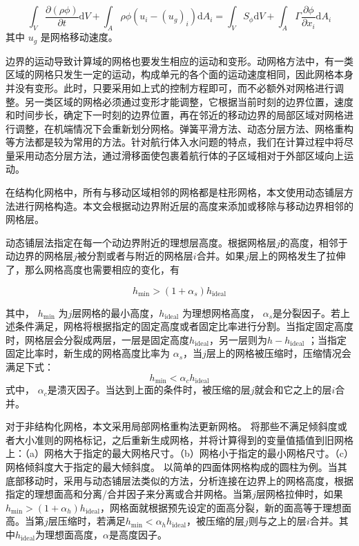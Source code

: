 \begin{equation}
  \int _V \frac {\partial (\rho \phi)} {\partial t} \mathrm dV + \int_A \rho \phi (u_i - (u_g)_i) \mathrm d A_i = \int_V S_\phi \mathrm dV + \int _A \Gamma \frac {\partial \phi}{\partial x_i} \mathrm d A_i
\end{equation}
其中 $u_g$ 是网格移动速度。

边界的运动导致计算域的网格也要发生相应的运动和变形。动网格方法中，有一类区域的网格只发生一定的运动，构成单元的各个面的运动速度相同，因此网格本身并没有变形。此时，只要采用如上式的控制方程即可，而不必额外对网格进行调整。另一类区域的网格必须通过变形才能调整，它根据当前时刻的边界位置，速度和时间步长，确定下一时刻的边界位置，再在邻近的移动边界的局部区域对网格进行调整，在机端情况下会重新划分网格。弹簧平滑方法、动态分层方法、网格重构等方法都是较为常用的方法。针对航行体入水问题的特点，我们在计算过程中将尽量采用动态分层方法，通过滑移面使包裹着航行体的子区域相对于外部区域向上运动。

在结构化网格中，所有与移动区域相邻的网格都是柱形网格，本文使用动态铺层方法进行网格构造。本文会根据动边界附近层的高度来添加或移除与移动边界相邻的网格层。

动态铺层法指定在每一个动边界附近的理想层高度。根据网格层$j$的高度，相邻于动边界的网格层$j$被分割或者与附近的网格层$i$合并。如果$j$层上的网格发生了拉伸了，那么网格高度也需要相应的变化，有

\begin{equation}
  h_{\min} > (1 + \alpha _s) h_{\mathrm{ideal}}
\end{equation}

其中， $h_{\min}$ 为$j$层网格的最小高度，$h_{\mathrm{ideal}}$ 为理想网格高度， $\alpha _s$是分裂因子。若上述条件满足，网格将根据指定的固定高度或者固定比率进行分割。当指定固定高度时，网格层会分裂成两层，一层是固定高度$h_{\mathrm{ideal}}$，另一层则为$h - h_{\mathrm{ideal}}$ ；当指定固定比率时，新生成的网格高度比率为 $\alpha_s$，当$j$层上的网格被压缩时，压缩情况会满足下式：
\begin{equation}
  h_{\min} < \alpha _c h_{\mathrm {ideal}}
\end{equation}
式中， $\alpha _c$是溃灭因子。当达到上面的条件时，被压缩的层$j$就会和它之上的层$i$合并。

对于非结构化网格，本文采用局部网格重构法更新网格。
将那些不满足倾斜度或者大小准则的网格标记，之后重新生成网格，并将计算得到的变量值插值到旧网格上：（a）网格大于指定的最大网格尺寸。（b）网格小于指定的最小网格尺寸。（c）网格倾斜度大于指定的最大倾斜度。
以简单的四面体网格构成的圆柱为例。当其底部移动时，采用与动态铺层法类似的方法，分析连接在边界上的网格高度，根据指定的理想面高和分离/合并因子来分离或合并网格。当第$j$层网格拉伸时，如果$h_{\min} > (1 + \alpha_h) h_{\mathrm{ideal}}$，网格面就根据预先设定的面高分裂，新的面高等于理想面高。当第$j$层压缩时，若满足$h_{\min} < \alpha _h h_{\mathrm{ideal}}$，被压缩的层$j$则与之上的层$i$合并。其中$h_{\mathrm{ideal}}$为理想面高度，$\alpha$是高度因子。

